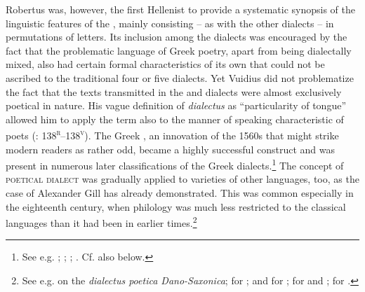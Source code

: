 Robertus \citet[146\textsc{\textsuperscript{v}}–148\textsc{\textsuperscript{v}}]{Vuidius1569} was, however, the first Hellenist to provide a systematic synopsis of the linguistic features of the , mainly consisting – as with the other dialects – in permutations of letters. Its inclusion among the dialects was encouraged by the fact that the problematic language of Greek poetry, apart from being dialectally mixed, also had certain formal characteristics of its own that could not be ascribed to the traditional four or five dialects. Yet Vuidius did not problematize the fact that the texts transmitted in the  and  dialects were almost exclusively poetical in nature. His vague definition of \textit{dialectus} as “particularity of tongue” allowed him to apply the term also to the manner of speaking characteristic of poets (\citealt{Vuidius1569}: 138\textsc{\textsuperscript{r}}–138\textsc{\textsuperscript{v}}). The Greek , an innovation of the 1560s that might strike modern readers as rather odd, became a highly successful construct and was present in numerous later classifications of the Greek dialects.\footnote{See e.g. \citet[\textsc{x}.1\textsc{\textsuperscript{v}}]{Dabercusius1577}; \citet[\textsc{i.1}\textsc{\textsuperscript{v}}]{Camden1595}; \citet[376--377]{Kober1701}; \citet[113]{Petisco1764}. Cf. also  below.} The concept of \textsc{poetical} \textsc{dialect} was gradually applied to varieties of other languages, too, as the case of Alexander Gill has already demonstrated. This was common especially in the eighteenth century, when philology was much less restricted to the classical languages than it had been in earlier times.\footnote{See e.g. \citet[101]{Hickes1705} on the \textit{dialectus poetica Dano-Saxonica}; \citet[*.3\textsc{\textsuperscript{r}}]{Verwer1707} for ; \citet[24]{Wesley1736} and \citet{Vogel1764} for ; \citet[240, 241]{Beattie1778} for  and ; \citet[292]{Macnicol1779} for .}

